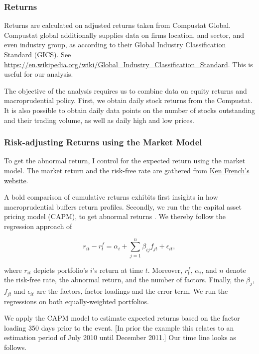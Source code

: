 \documentclass[11pt]{article}
\begin{document}
\subsubsection*{Returns}

Returns are calculated on adjusted returns taken from Compustat Global. Compustat global additionally supplies data on firms location, and sector, and even industry group, as according to their Global Industry Classification Standard (GICS). See \url{https://en.wikipedia.org/wiki/Global_Industry_Classification_Standard}. This is useful for our analysis.

The objective of the analysis requires us to combine data on equity returns and macroprudential policy. First, we obtain daily stock returns from the Compustat. It is also possible to obtain daily data points on the number of stocks outstanding and their trading volume, as well as daily high and low prices.

\subsubsection*{Risk-adjusting Returns using the Market Model} \label{sec:eventstudymethod}
To get the abnormal return, I control for the expected return using the market model. The market return and the risk-free rate are gathered from \href{https://mba.tuck.dartmouth.edu/pages/faculty/ken.french/data_library.html}{Ken French's website}.

A bold comparison of cumulative returns exhibits first insights in how macroprudential buffers return profiles. Secondly, we run the the capital asset pricing model (CAPM), to get abnormal returns \citep[see][]{Sharpe1964,Fama1967}. We thereby follow the regression approach of


\begin{equation}
\label{eq:riskadjustment}
r_{it} - r_t^f = \alpha_i + \sum_{j=1}^{n} \beta_{ij} f_{jt} + \epsilon_{it},
\end{equation}

where $r_{it}$ depicts portfolio's $i$'s return at time $t$. Moreover, $r_t^f$, $\alpha_i$, and $n$ denote the risk-free rate, the abnormal return, and the number of factors. Finally, the $\beta_{j}$, $f_{jt}$ and $\epsilon_{it}$ are the factors, factor loadings and the error term. We run the regressions on both equally-weighted portfolios.


We apply the CAPM model to estimate expected returns based on the factor loading 350 days prior to the event. [In prior the example this relates to an estimation period of July 2010 until December 2011.] Our time line looks as follows.
\end{document}
